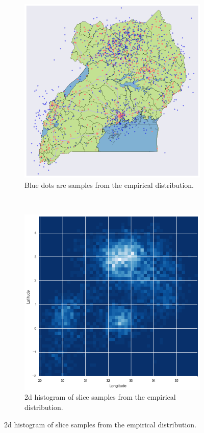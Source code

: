 \documentclass{article} %
\begin{document}
\begin{figure}
  \centering
  \begin{subfigure}[b]{0.5\textwidth}
    \centering
    \includegraphics[width=\textwidth]{figures/1000-slice-samples}
    \caption{Blue dots are samples from the empirical distribution.}
    \label{fig:sampled-conflicts}
  \end{subfigure}~\begin{subfigure}[b]{0.5\textwidth}
    \centering
    \includegraphics[width=\textwidth]{figures/histogram}
    \caption{2d histogram of slice samples from the empirical distribution.}
    \label{fig:histogram}
  \end{subfigure}
\end{figure}
\end{document}
